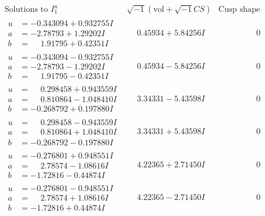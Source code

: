 \documentclass[1p]{elsarticle_modified}
\theoremstyle{definition}
\newcommand{\I}{\sqrt{-1}}
\begin{document}
$$\begin{array}{c|c|c}  
\text{Solutions to }I^u_{1}& \I (\text{vol} + \sqrt{-1}CS) & \text{Cusp shape}\\
 \hline 
\begin{aligned}
u &= -0.343094 + 0.932755 I \\
a &= -2.78793 + 1.29202 I \\
b &= \phantom{-}1.91795 + 0.42351 I\end{aligned}
 & \phantom{-}0.45934 + 5.84256 I & \phantom{-0.000000 } 0 \\ \hline\begin{aligned}
u &= -0.343094 - 0.932755 I \\
a &= -2.78793 - 1.29202 I \\
b &= \phantom{-}1.91795 - 0.42351 I\end{aligned}
 & \phantom{-}0.45934 - 5.84256 I & \phantom{-0.000000 } 0 \\ \hline\begin{aligned}
u &= \phantom{-}0.298458 + 0.943559 I \\
a &= \phantom{-}0.810864 - 1.048410 I \\
b &= -0.268792 + 0.197880 I\end{aligned}
 & \phantom{-}3.34331 - 5.43598 I & \phantom{-0.000000 } 0 \\ \hline\begin{aligned}
u &= \phantom{-}0.298458 - 0.943559 I \\
a &= \phantom{-}0.810864 + 1.048410 I \\
b &= -0.268792 - 0.197880 I\end{aligned}
 & \phantom{-}3.34331 + 5.43598 I & \phantom{-0.000000 } 0 \\ \hline\begin{aligned}
u &= -0.276801 + 0.948551 I \\
a &= \phantom{-}2.78574 - 1.08616 I \\
b &= -1.72816 - 0.44874 I\end{aligned}
 & \phantom{-}4.22365 + 2.71450 I & \phantom{-0.000000 } 0 \\ \hline\begin{aligned}
u &= -0.276801 - 0.948551 I \\
a &= \phantom{-}2.78574 + 1.08616 I \\
b &= -1.72816 + 0.44874 I\end{aligned}
 & \phantom{-}4.22365 - 2.71450 I & \phantom{-0.000000 } 0 \\ \hline\begin{aligned}

\end{aligned}
\end{array}$$
\end{document}
